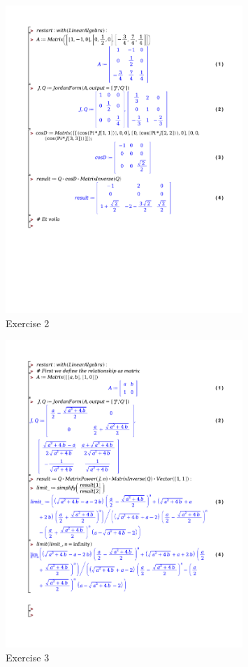\documentclass[a4paper]{article}
\begin{document}
\begin{figure}[H]
	\centering
	\includegraphics[width=0.8\textwidth]{exercises/wc_3_ex_2.pdf}
	\caption{Exercise 2}
	\label{fig:wc_3_ex_2}
\end{figure}

\begin{figure}[H]
	\centering
	\includegraphics[width=0.8\textwidth]{exercises/wc_3_ex_3.pdf}
	\caption{Exercise 3}
	\label{fig:wc_3_ex_3}
\end{figure}
\end{document}

